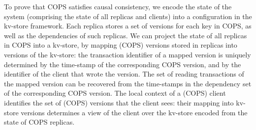 

To prove that COPS satisfies causal consistency, we encode the state of the system 
(comprising the state of all replicas and clients) into a configuration in the kv-store framework.
Each replica stores a set of versions for each key in COPS, as well as the dependencies of 
such replicas. We can project the state of all replicas in COPS into a kv-store, 
by mapping  (COPS) versions stored in replicas into versions of the kv-store: 
the transaction identifier of a mapped version is uniquely determined by the time-stamp of the corresponding COPS version, and 
by the identifier of the client that wrote the version. The set of reading transactions of the mapped version 
can be recovered from the time-stamps in the dependency set of the corresponding COPS version. 
The local context of a (COPS) client identifies the set of (COPS) versions that the client sees: 
their mapping into kv-store versions determines a view of the client over the 
kv-store encoded from the state of COPS replicas.

